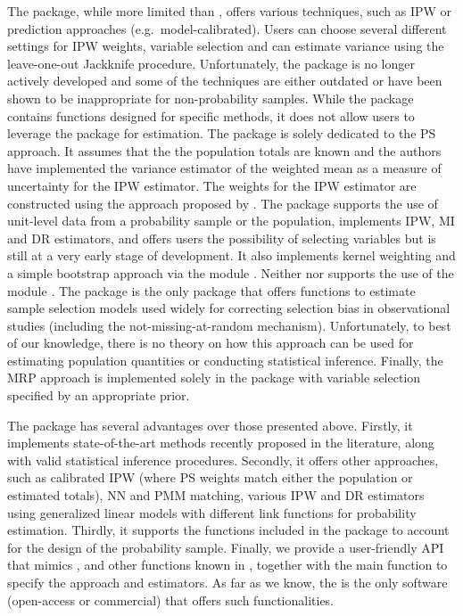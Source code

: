 \documentclass[
]{jss}
\begin{document}
The  package, while more limited than ,
offers various techniques, such as IPW or prediction approaches
(e.g.~model-calibrated). Users can choose several different settings for
IPW weights, variable selection and can estimate variance using the
leave-one-out Jackknife procedure. Unfortunately, the package is no
longer actively developed and some of the techniques are either outdated
or have been shown to be inappropriate for non-probability samples.
While the package contains functions designed for specific methods, it
does not allow users to leverage the  package for
estimation. The  package is solely dedicated to the PS
approach. It assumes that the the population totals are known and the
authors have implemented the variance estimator of the weighted mean as
a measure of uncertainty for the IPW estimator. The weights for the IPW
estimator are constructed using the approach proposed by
\citet{Schonlau2017}. The  package supports the use of
unit-level data from a probability sample or the population, implements
IPW, MI and DR estimators, and offers users the possibility of selecting
variables but is still at a very early stage of development. It also
implements kernel weighting and a simple bootstrap approach via the
 module \citep{scipy2020}. Neither  nor
 supports the use of the  module
\citep{Diallo2021}. The  package is the only package that
offers functions to estimate sample selection models used widely for
correcting selection bias in observational studies (including the
not-missing-at-random mechanism). Unfortunately, to best of our
knowledge, there is no theory on how this approach can be used for
estimating population quantities or conducting statistical inference.
Finally, the MRP approach is implemented solely in the 
package with variable selection specified by an appropriate prior.

The  package has several advantages over those presented
above. Firstly, it implements state-of-the-art methods recently proposed
in the literature, along with valid statistical inference procedures.
Secondly, it offers other approaches, such as calibrated IPW (where PS
weights match either the population or estimated totals), NN and PMM
matching, various IPW and DR estimators using generalized linear models
with different link functions for probability estimation. Thirdly, it
supports the functions included in the  package to account
for the design of the probability sample. Finally, we provide a
user-friendly API that mimics ,  and
other functions known in , together with the main function
to specify the approach and estimators. As far as we know, the
 is the only software (open-access or commercial) that
offers such functionalities.
\end{document}
